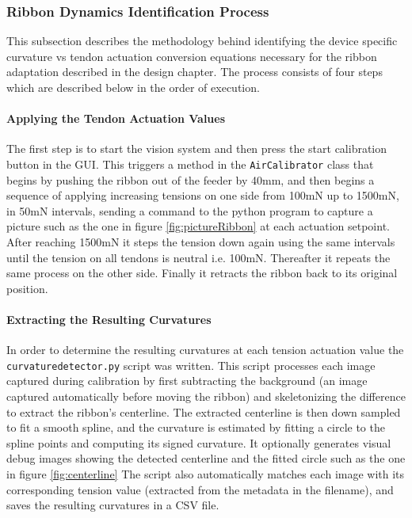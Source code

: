 \subsubsection{Ribbon Dynamics Identification Process}
This subsection describes the methodology behind identifying the device specific curvature vs tendon actuation conversion equations necessary for the ribbon adaptation described in the design chapter. The process consists of four steps which are described below in the  order of execution.

\paragraph*{Applying the Tendon Actuation Values}
The first step is to start the vision system and then press the start calibration button in the GUI. This triggers a method in the \texttt{AirCalibrator} class that begins by pushing the ribbon out of the feeder by 40mm, and then begins a sequence of applying increasing tensions on one side from 100mN up to 1500mN, in 50mN intervals, sending a command to the python program to capture a picture such as the one in figure \ref{fig:pictureRibbon} at each actuation setpoint. After reaching 1500mN it steps the tension down again using the same intervals until the tension on all tendons is neutral i.e. 100mN. Thereafter it repeats the same process on the other side. Finally it retracts the ribbon back to its original position.

\paragraph*{Extracting the Resulting Curvatures}
In order to determine the resulting curvatures at each tension actuation value the \texttt{curvaturedetector.py} script was written. This script processes each image captured during calibration by first subtracting the background (an image captured automatically before moving the ribbon) and skeletonizing the difference to extract the ribbon's centerline. The extracted centerline is then down sampled to fit a smooth spline, and the curvature is estimated by fitting a circle to the spline points and computing its signed curvature. It optionally generates visual debug images showing the detected centerline and the fitted circle such as the one in figure \ref{fig:centerline} The script also automatically matches each image with its corresponding tension value (extracted from the metadata in the filename), and saves the resulting curvatures in a CSV file.

